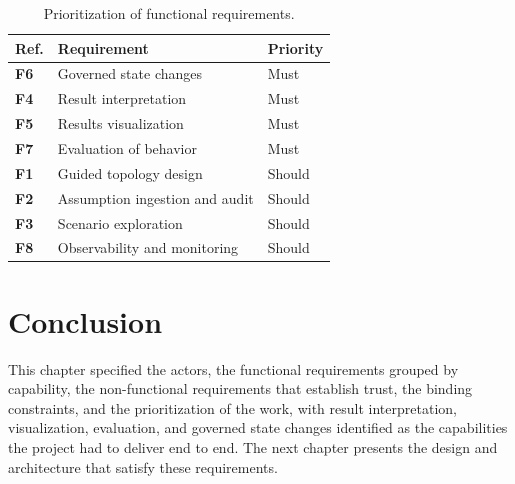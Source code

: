 \begin{table}[H]
  \centering
  \small
  \begin{tabularx}{\linewidth}{@{}>{\bfseries}l >{\raggedright\arraybackslash}X >{\centering\arraybackslash}p{2.4cm}@{}}
    \toprule
    \textbf{Ref.} & \textbf{Requirement} & \textbf{Priority} \\
    \midrule
    F6 & Governed state changes & Must \\
    F4 & Result interpretation & Must \\
    F5 & Results visualization & Must \\
    F7 & Evaluation of behavior & Must \\
    F1 & Guided topology design & Should \\
    F2 & Assumption ingestion and audit & Should \\
    F3 & Scenario exploration & Should \\
    F8 & Observability and monitoring & Should \\
    \bottomrule
  \end{tabularx}
  \caption{Prioritization of functional requirements.}
  \label{tab:prio}
\end{table}

\section*{Conclusion}

This chapter specified the actors, the functional requirements grouped by
capability, the non-functional requirements that establish trust, the binding
constraints, and the prioritization of the work, with result interpretation,
visualization, evaluation, and governed state changes identified as the
capabilities the project had to deliver end to end. The next chapter presents
the design and architecture that satisfy these requirements.
